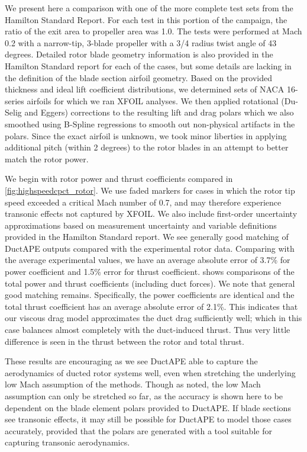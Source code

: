 We present here a comparison with one of the more complete test sets from the Hamilton Standard Report.
%
For each test in this portion of the campaign, the ratio of the exit area to propeller area was 1.0.
%
The tests were performed at Mach 0.2 with a narrow-tip, 3-blade propeller with a 3/4 radius twist angle of 43 degrees.
%
Detailed rotor blade geometry information is also provided in the Hamilton Standard report for each of the cases, but some details are lacking in the definition of the blade section airfoil geometry.
%
Based on the provided thickness and ideal lift coefficient distributions, we determined sets of NACA 16-series airfoils for which we ran XFOIL analyses.
%
We then applied rotational (Du-Selig\cite{DuSelig_1998} and Eggers\cite{Eggers_2003}) corrections to the resulting lift and drag polars which we also smoothed using B-Spline regressions to smooth out non-physical artifacts in the polars.
%
Since the exact airfoil is unknown, we took minor liberties in applying additional pitch (within 2 degrees) to the rotor blades in an attempt to better match the rotor power.

We begin with rotor power and thrust coefficients compared in \cref{fig:highspeedcpct_rotor}.
%
We use faded markers for cases in which the rotor tip speed exceeded a critical Mach number of 0.7, and may therefore experience transonic effects not captured by XFOIL.
%
We also include first-order uncertainty approximations based on measurement uncertainty and variable definitions provided in the Hamilton Standard report.
%
We see generally good matching of DuctAPE outputs compared with the experimental rotor data.
%
Comparing with the average experimental values, we have an average absolute error of 3.7\% for power coefficient and 1.5\% error for thrust coefficient.
%
 shows comparisons of the total power and thrust coefficients (including duct forces).
%
We note that general good matching remains.
%
Specifically, the power coefficients are identical and the total thrust coefficient has an average absolute error of 2.1\%.
%
This indicates that our viscous drag model approximates the duct drag sufficiently well; which in this case balances almost completely with the duct-induced thrust.
%
Thus very little difference is seen in the thrust between the rotor and total thrust.


These results are encouraging as we see DuctAPE able to capture the aerodynamics of ducted rotor systems well, even when stretching the underlying low Mach assumption of the methods.
%
Though as noted, the low Mach assumption can only be stretched so far, as the accuracy is shown here to be dependent on the blade element polars provided to DuctAPE.
%
If blade sections see transonic effects, it may still be possible for DuctAPE to model those cases accurately, provided that the polars are generated with a tool suitable for capturing transonic aerodynamics.

